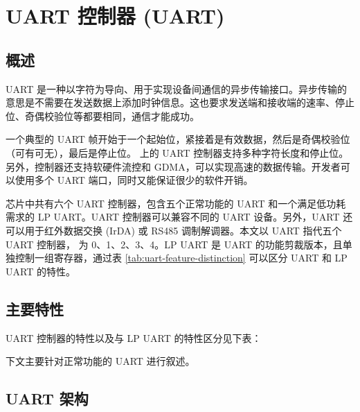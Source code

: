 \documentclass[main\_\_CN.tex]{subfiles}
\begin{document}

\ifglobal
\else
    {\let\clearpage\relax \listoftodos}
    {\let\clearpage\relax \listofdonetodos}
    \tableofcontents
\fi



\hypertarget{uart}{}
\chapter{UART 控制器 (UART)}
\label{mod:uart}


\section{概述}

UART 是一种以字符为导向、用于实现设备间通信的异步传输接口。异步传输的意思是不需要在发送数据上添加时钟信息。这也要求发送端和接收端的速率、停止位、奇偶校验位等都要相同，通信才能成功。

一个典型的 UART 帧开始于一个起始位，紧接着是有效数据，然后是奇偶校验位（可有可无），最后是停止位。\chipname{} 上的 UART 控制器支持多种字符长度和停止位。另外，控制器还支持软硬件流控和 GDMA，可以实现高速的数据传输。开发者可以使用多个 UART 端口，同时又能保证很少的软件开销。

\chipname{} 芯片中共有六个 UART 控制器，包含五个正常功能的 UART 和一个满足低功耗需求的 LP UART。UART 控制器可以兼容不同的 UART 设备。另外，UART 还可以用于红外数据交换 (IrDA) 或 RS485 调制解调器。本文以 UART 指代五个 UART 控制器， 为 0、1、2、3、4。LP UART 是 UART 的功能剪裁版本，且单独控制一组寄存器，通过表 \ref{tab:uart-feature-distinction} 可以区分 UART 和 LP UART 的特性。

\section{主要特性}

UART 控制器的特性以及与 LP UART 的特性区分见下表：



下文主要针对正常功能的 UART 进行叙述。

\clearpage
\section{UART 架构}
\end{document}
